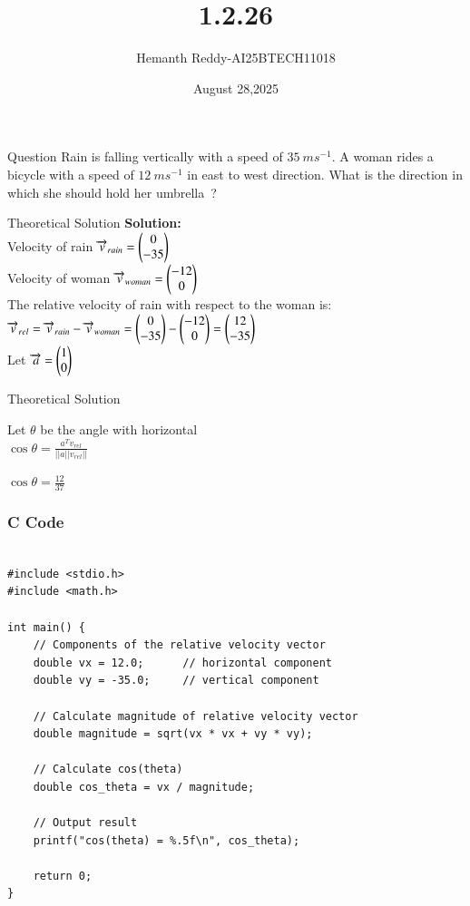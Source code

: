 \documentclass{beamer}
\title %
{1.2.26}
\date{August 28,2025}
\author %
{Hemanth Reddy-AI25BTECH11018}
\begin{document}
\frame{\titlepage}
\begin{frame}{Question}
Rain is falling vertically with a speed of $35~ms^{-1}$. A woman rides a bicycle with a speed of $12~ms^{-1}$ in east to west direction. What is the direction in which she should hold her umbrella~?
\end{frame}



\begin{frame}{Theoretical Solution}
\textbf{Solution:}\\
Velocity of rain $\overrightarrow{v}_{rain}=\begin{pmatrix}0\\
-35\end{pmatrix}$\\
Velocity of woman $\overrightarrow{v}_{woman}=\begin{pmatrix}-12\\0\end{pmatrix}$\\
The relative velocity of rain with respect to the woman is:$\overrightarrow{v}_{rel}=\overrightarrow{v}_{rain}-\overrightarrow{v}_{woman}\\ = \begin{pmatrix}0\\
-35\end{pmatrix}-\begin{pmatrix}-12\\0\end{pmatrix}= \begin{pmatrix}12\\-35\end{pmatrix}$\\
Let $\overrightarrow{a} = \begin{pmatrix}1\\0\end{pmatrix}$\\

\end{frame}

\begin{frame}{Theoretical Solution}

Let $\theta$ be the angle with horizontal\\
$\cos \theta= \frac{a^{T} v_{rel}}{||a||v_{rel}||}$

$\cos \theta= \frac{12}{37}$
\end{frame}




\begin{frame}[fragile]
    \frametitle{C Code }
    \begin{lstlisting}

#include <stdio.h>
#include <math.h>

int main() {
    // Components of the relative velocity vector
    double vx = 12.0;      // horizontal component
    double vy = -35.0;     // vertical component

    // Calculate magnitude of relative velocity vector
    double magnitude = sqrt(vx * vx + vy * vy);

    // Calculate cos(theta)
    double cos_theta = vx / magnitude;

    // Output result
    printf("cos(theta) = %.5f\n", cos_theta);
    
    return 0;
}

    \end{lstlisting}
\end{frame}
\end{document}
